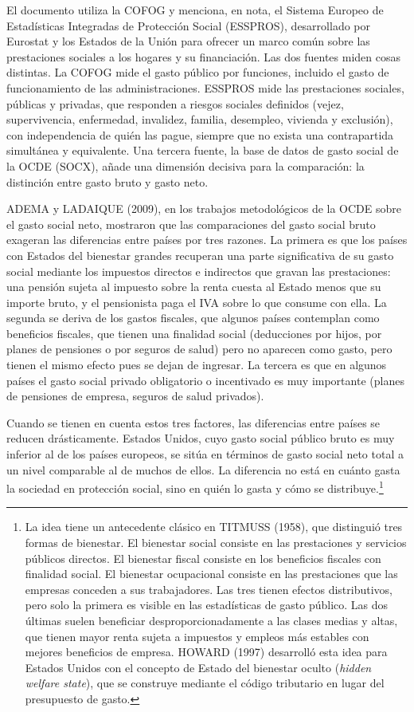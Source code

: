 \documentclass[10pt,a4paper]{article}
\begin{document}
El documento utiliza la COFOG y menciona, en nota, el Sistema Europeo de Estadísticas Integradas de Protección Social (ESSPROS), desarrollado por Eurostat y los Estados de la Unión para ofrecer un marco común sobre las prestaciones sociales a los hogares y su financiación. Las dos fuentes miden cosas distintas. La COFOG mide el gasto público por funciones, incluido el gasto de funcionamiento de las administraciones. ESSPROS mide las prestaciones sociales, públicas y privadas, que responden a riesgos sociales definidos (vejez, supervivencia, enfermedad, invalidez, familia, desempleo, vivienda y exclusión), con independencia de quién las pague, siempre que no exista una contrapartida simultánea y equivalente. Una tercera fuente, la base de datos de gasto social de la OCDE (SOCX), añade una dimensión decisiva para la comparación: la distinción entre gasto bruto y gasto neto.

ADEMA y LADAIQUE (2009), en los trabajos metodológicos de la OCDE sobre el gasto social neto, mostraron que las comparaciones del gasto social bruto exageran las diferencias entre países por tres razones. La primera es que los países con Estados del bienestar grandes recuperan una parte significativa de su gasto social mediante los impuestos directos e indirectos que gravan las prestaciones: una pensión sujeta al impuesto sobre la renta cuesta al Estado menos que su importe bruto, y el pensionista paga el IVA sobre lo que consume con ella. La segunda se deriva de los gastos fiscales, que algunos países contemplan como beneficios fiscales, que tienen una finalidad social (deducciones por hijos, por planes de pensiones o por seguros de salud) pero no aparecen como gasto, pero tienen el mismo efecto pues se dejan de ingresar. La tercera es que en algunos países el gasto social privado obligatorio o incentivado es muy importante (planes de pensiones de empresa, seguros de salud privados). 

Cuando se tienen en cuenta estos tres factores, las diferencias entre países se reducen drásticamente. Estados Unidos, cuyo gasto social público bruto es muy inferior al de los países europeos, se sitúa en términos de gasto social neto total a un nivel comparable al de muchos de ellos. La diferencia no está en cuánto gasta la sociedad en protección social, sino en quién lo gasta y cómo se distribuye.\footnote{%
    La idea tiene un antecedente clásico en TITMUSS (1958), que distinguió tres formas de bienestar. El bienestar social consiste en las prestaciones y servicios públicos directos. El bienestar fiscal consiste en los beneficios fiscales con finalidad social. El bienestar ocupacional consiste en las prestaciones que las empresas conceden a sus trabajadores. Las tres tienen efectos distributivos, pero solo la primera es visible en las estadísticas de gasto público. Las dos últimas suelen beneficiar desproporcionadamente a las clases medias y altas, que tienen mayor renta sujeta a impuestos y empleos más estables con mejores beneficios de empresa. HOWARD (1997) desarrolló esta idea para Estados Unidos con el concepto de Estado del bienestar oculto (\textit{hidden welfare state}), que se construye mediante el código tributario en lugar del presupuesto de gasto.
} 
\end{document}
